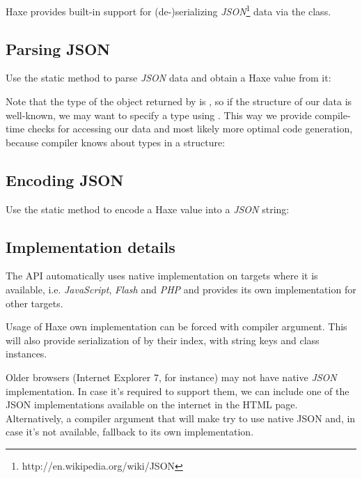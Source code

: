 Haxe provides built-in support for (de-)serializing \emph{JSON}\footnote{http://en.wikipedia.org/wiki/JSON} data via the  class.

\subsection{Parsing JSON}
\label{std-Json-parsing}

Use the  static method to parse \emph{JSON} data and obtain a Haxe value from it:

Note that the type of the object returned by  is , so if the structure of our data is well-known, we may want to specify a type using . This way we provide compile-time checks for accessing our data and most likely more optimal code generation, because compiler knows about types in a structure:

\subsection{Encoding JSON}
\label{std-Json-encoding}

Use the  static method to encode a Haxe value into a \emph{JSON} string:

\subsection{Implementation details}
\label{std-Json-implementation-details}

The  API automatically uses native implementation on targets where it is available, i.e. \emph{JavaScript}, \emph{Flash} and \emph{PHP} and provides its own implementation for other targets.

Usage of Haxe own implementation can be forced with  compiler argument. This will also provide serialization of  by their index,  with string keys and class instances.

Older browsers (Internet Explorer 7, for instance) may not have native \emph{JSON} implementation. In case it's required to support them, we can include one of the JSON implementations available on the internet in the HTML page. Alternatively, a  compiler argument that will make  try to use native JSON and, in case it's not available, fallback to its own implementation.

